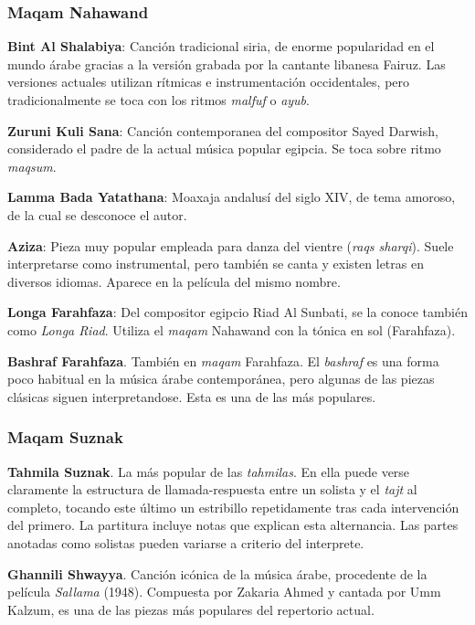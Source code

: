 \subsubsection*{Maqam Nahawand}
\begin{compactitem}
\item \textbf{Bint Al Shalabiya}: Canción tradicional siria, de enorme popularidad en el mundo árabe gracias a la versión grabada por la cantante libanesa Fairuz. Las versiones actuales utilizan rítmicas e instrumentación occidentales, pero tradicionalmente se toca con los ritmos \emph{malfuf} o \emph{ayub}.
\item \textbf{Zuruni Kuli Sana}: Canción contemporanea del compositor Sayed Darwish, considerado el padre de la actual música popular egipcia. Se toca sobre ritmo \emph{maqsum}.
\item \textbf{Lamma Bada Yatathana}: Moaxaja andalusí del siglo XIV, de tema amoroso, de la cual se desconoce el autor.
\item \textbf{Aziza}: Pieza muy popular empleada para danza del vientre (\emph{raqs sharqi}). Suele interpretarse como instrumental, pero también se canta y existen letras en diversos idiomas. Aparece en la película del mismo nombre.
\item \textbf{Longa Farahfaza}: Del compositor egipcio Riad Al Sunbati, se la conoce también como \emph{Longa Riad}. Utiliza el \emph{maqam} Nahawand con la tónica en sol (Farahfaza).
\item \textbf{Bashraf Farahfaza}. También en \emph{maqam} Farahfaza. El \emph{bashraf} es una forma poco habitual en la música árabe contemporánea, pero algunas de las piezas clásicas siguen interpretandose. Esta es una de las más populares.
\end{compactitem}

\subsubsection*{Maqam Suznak}
\begin{compactitem}
\item \textbf{Tahmila Suznak}. La más popular de las \emph{tahmilas}. En ella puede verse claramente la estructura de llamada-respuesta entre un solista y el \emph{tajt} al completo, tocando este último un estribillo repetidamente tras cada intervención del primero. La partitura incluye notas que explican esta alternancia. Las partes anotadas como solistas pueden variarse a criterio del interprete.
\item \textbf{Ghannili Shwayya}. Canción icónica de la música árabe, procedente de la película \emph{Sallama} (1948). Compuesta por Zakaria Ahmed y cantada por Umm Kalzum, es una de las piezas más populares del repertorio actual.
\end{compactitem}

